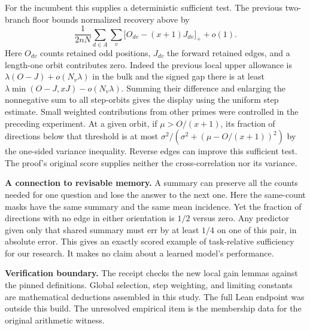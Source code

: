 \documentclass[12pt,letterpaper]{article}
\newcommand{\para}[1]{\par\medskip\noindent\textbf{#1}\quad}
\begin{document}
For the incumbent this supplies a deterministic sufficient test. The previous two-branch floor bounds normalized recovery above by
\[
 \frac{1}{2nN}\sum_{d\in A}\sum_{v}
 \big[O_{dv}-(x+1)J_{dv}\big]_+ +o(1).
\]
Here \(O_{dv}\) counts retained odd positions, \(J_{dv}\) the forward retained edges, and a length-one orbit contributes zero. Indeed the previous local upper allowance is \(\lambda(O-J)+o(N_v\lambda)\) in the bulk and the signed gap there is at least \(\lambda\min(O-J,xJ)-o(N_v\lambda)\). Summing their difference and enlarging the nonnegative sum to all step-orbits gives the display using the uniform step estimate. Small weighted contributions from other primes were controlled in the preceding experiment. At a given orbit, if \(\mu>O/(x+1)\), its fraction of directions below that threshold is at most \(\sigma^2/(\sigma^2+(\mu-O/(x+1))^2)\) by the one-sided variance inequality. Reverse edges can improve this sufficient test. The proof's original score supplies neither the cross-correlation nor its variance.

\para{A connection to revisable memory.} A summary can preserve all the counts needed for one question and lose the answer to the next one. Here the same-count masks have the same summary and the same mean incidence. Yet the fraction of directions with no edge in either orientation is \(1/2\) versus zero. Any predictor given only that shared summary must err by at least \(1/4\) on one of this pair, in absolute error. This gives an exactly scored example of task-relative sufficiency for our research. It makes no claim about a learned model's performance.

\para{Verification boundary.} The receipt checks the new local gain lemmas against the pinned definitions. Global selection, step weighting, and limiting constants are mathematical deductions assembled in this study. The full Lean endpoint was outside this build. The unresolved empirical item is the membership data for the original arithmetic witness.
\end{document}
